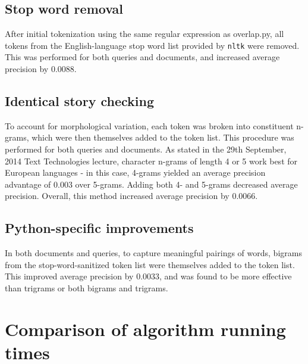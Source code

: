 \documentclass{article}
\begin{document}
\subsection{Stop word removal}
After initial tokenization using the same regular expression as overlap.py, all tokens from the English-language stop word list provided by \texttt{nltk} were removed. This was performed for both queries and documents, and increased average precision by 0.0088.
\subsection{Identical story checking}
To account for morphological variation, each token was broken into constituent n-grams, which were then themselves added to the token list. This procedure was performed for both queries and documents. As stated in the 29th September, 2014 Text Technologies lecture, character n-grams of length 4 or 5 work best for European languages - in this case, 4-grams yielded an average precision advantage of 0.003 over 5-grams. Adding both 4- and 5-grams decreased average precision. Overall, this method increased average precision by 0.0066.
\subsection{Python-specific improvements}
In both documents and queries, to capture meaningful pairings of words, bigrams from the stop-word-sanitized token list were themselves added to the token list. This improved average precision by 0.0033, and was found to be more effective than trigrams or both bigrams and trigrams.

\section{Comparison of algorithm running times}
\end{document}
